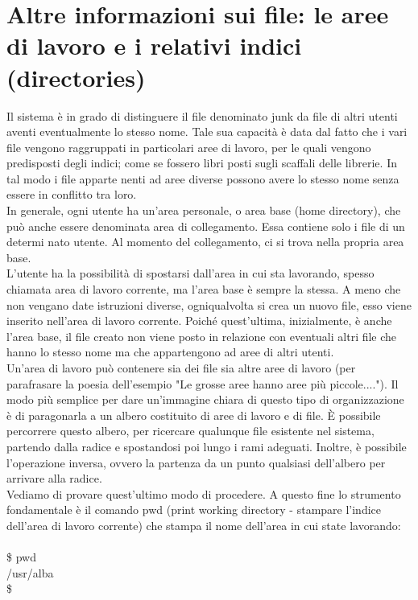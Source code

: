 \section{Altre informazioni sui file: le aree di lavoro e i relativi indici (directories)}
Il sistema è in grado di distinguere il file denominato junk da file di altri utenti aventi
eventualmente lo stesso nome. Tale sua capacità è data dal fatto che i vari file vengono raggruppati in particolari aree di lavoro, per le quali vengono predisposti degli indici; come se fossero libri posti sugli scaffali delle librerie. In tal modo i file apparte
nenti ad aree diverse possono avere lo stesso nome senza essere in conflitto tra loro.\\
In generale, ogni utente ha un'area personale, o area base (home directory), che può
anche essere denominata area di collegamento. Essa contiene solo i file di un determi
nato utente. Al momento del collegamento, ci si trova nella propria area base.\\
L'utente ha la possibilità di spostarsi dall'area in cui sta lavorando, spesso chiamata
area di lavoro corrente, ma l'area base è sempre la stessa. A meno che non vengano
date istruzioni diverse, ogniqualvolta si crea un nuovo file, esso viene inserito
nell'area di lavoro corrente. Poiché quest'ultima, inizialmente, è anche l'area base, il
file creato non viene posto in relazione con eventuali altri file che hanno lo stesso
nome ma che appartengono ad aree di altri utenti.\\
Un'area di lavoro può contenere sia dei file sia altre aree di lavoro (per parafrasare
la poesia dell'esempio "Le grosse aree hanno aree più piccole...."). Il modo più 
semplice per dare un'immagine chiara di questo tipo di organizzazione è di paragonarla a
un albero costituito di aree di lavoro e di file. È possibile percorrere questo albero,
per ricercare qualunque file esistente nel sistema, partendo dalla radice e spostandosi
poi lungo i rami adeguati. Inoltre, è possibile l'operazione inversa, ovvero la 
partenza da un punto qualsiasi dell'albero per arrivare alla radice.\\
Vediamo di provare quest'ultimo modo di procedere. A questo fine lo strumento
fondamentale è il comando pwd (print working directory - stampare l'indice dell'area
di lavoro corrente) che stampa il nome dell'area in cui state lavorando:\\\\
\$ pwd\\
/usr/alba\\
\$\\\\
